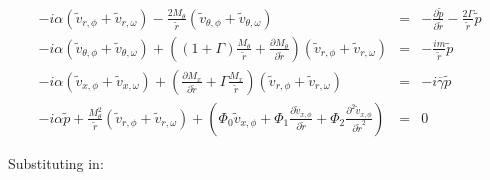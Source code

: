 \documentclass[12pt]{article}
\begin{document}
\begin{eqnarray}
-i \alpha 
\left(
\widetilde{v}_{r,\phi} 
+\widetilde{v}_{r,\omega} 
\right)
-\frac{2 M_{\theta}}{\widetilde{r}} 
\left(
\widetilde{v}_{\theta,\phi} 
+\widetilde{v}_{\theta,\omega} 
\right)
&=&
-
\frac{\partial \widetilde{p} }{\partial \widetilde{r}} 
-
\frac{2 \Gamma}{\widetilde{r}} \widetilde{p}
\nonumber
\\
-i
\alpha
\left(
\widetilde{v}_{\theta,\phi} 
+\widetilde{v}_{\theta,\omega} 
\right)
+
\left(
\left(1 + \Gamma \right)
\frac{M_{\theta} }{\widetilde{r}}
+
\frac{\partial M_{\theta} }{\partial \widetilde{r}}
\right) 
\left(
\widetilde{v}_{r,\phi} 
+\widetilde{v}_{r,\omega} 
\right)
&=&
-\frac{i m }{\widetilde{r} } \widetilde{p}
\nonumber
\\
-i
\alpha
\left(
\widetilde{v}_{x,\phi} 
+\widetilde{v}_{x,\omega} 
\right)
+
\left(
\frac{\partial M_x }{\partial \widetilde{r}} 
+
\Gamma \frac{M_x }{\widetilde{r}}
\right)
\left(
\widetilde{v}_{r,\phi} 
+\widetilde{v}_{r,\omega} 
\right)
&=&
-i \overline{\gamma} \widetilde{p}
\nonumber
\\
-i
\alpha
 \widetilde{p}
+
\frac{M_{\theta}^2}{\widetilde{r}}
\left(
\widetilde{v}_{r,\phi} 
+\widetilde{v}_{r,\omega} 
\right)
+ 
\left(
\Phi_0 
\widetilde{v}_{x,\phi}
+\Phi_1 
\frac{\partial
\widetilde{v}_{x,\phi}
}{\partial \widetilde{r}} 
+\Phi_2 
\frac{\partial^2
\widetilde{v}_{x,\phi}
}{\partial \widetilde{r}^2} 
\right)
&=&
0
\nonumber
\end{eqnarray}

Substituting in:
\end{document}
